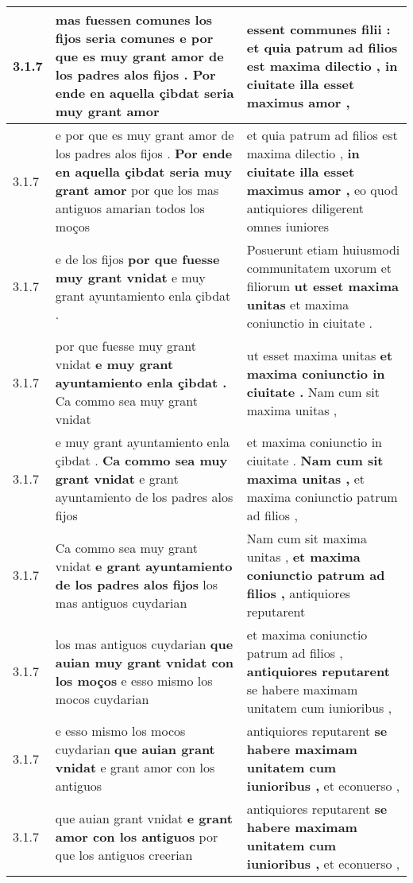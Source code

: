 \begin{tabular}{|p{1cm}|p{6.5cm}|p{6.5cm}|}
3.1.7 & mas fuessen comunes los fijos seria comunes \textbf{ e por que es muy grant amor de los padres alos fijos . } Por ende en aquella çibdat seria muy grant amor & essent communes filii : \textbf{ et quia patrum ad filios est maxima dilectio , } in ciuitate illa esset maximus amor , \\\hline
3.1.7 & e por que es muy grant amor de los padres alos fijos . \textbf{ Por ende en aquella çibdat seria muy grant amor } por que los mas antiguos amarian todos los moços & et quia patrum ad filios est maxima dilectio , \textbf{ in ciuitate illa esset maximus amor , } eo quod antiquiores diligerent omnes iuniores \\\hline
3.1.7 & e de los fijos \textbf{ por que fuesse muy grant vnidat } e muy grant ayuntamiento enla çibdat . & Posuerunt etiam huiusmodi communitatem uxorum et filiorum \textbf{ ut esset maxima unitas } et maxima coniunctio in ciuitate . \\\hline
3.1.7 & por que fuesse muy grant vnidat \textbf{ e muy grant ayuntamiento enla çibdat . } Ca commo sea muy grant vnidat & ut esset maxima unitas \textbf{ et maxima coniunctio in ciuitate . } Nam cum sit maxima unitas , \\\hline
3.1.7 & e muy grant ayuntamiento enla çibdat . \textbf{ Ca commo sea muy grant vnidat } e grant ayuntamiento de los padres alos fijos & et maxima coniunctio in ciuitate . \textbf{ Nam cum sit maxima unitas , } et maxima coniunctio patrum ad filios , \\\hline
3.1.7 & Ca commo sea muy grant vnidat \textbf{ e grant ayuntamiento de los padres alos fijos } los mas antiguos cuydarian & Nam cum sit maxima unitas , \textbf{ et maxima coniunctio patrum ad filios , } antiquiores reputarent \\\hline
3.1.7 & los mas antiguos cuydarian \textbf{ que auian muy grant vnidat con los moços } e esso mismo los mocos cuydarian & et maxima coniunctio patrum ad filios , \textbf{ antiquiores reputarent } se habere maximam unitatem cum iunioribus , \\\hline
3.1.7 & e esso mismo los mocos cuydarian \textbf{ que auian grant vnidat } e grant amor con los antiguos & antiquiores reputarent \textbf{ se habere maximam unitatem cum iunioribus , } et econuerso , \\\hline
3.1.7 & que auian grant vnidat \textbf{ e grant amor con los antiguos } por que los antiguos creerian & antiquiores reputarent \textbf{ se habere maximam unitatem cum iunioribus , } et econuerso , \\\hline

\end{tabular}
